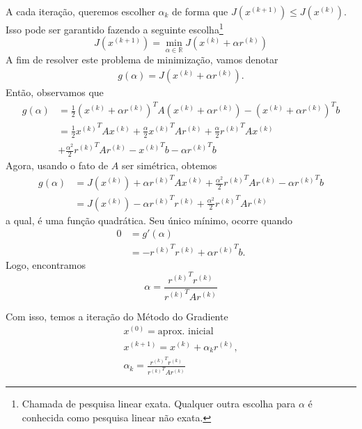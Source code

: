 A cada iteração, queremos escolher $\alpha_k$ de forma que $J\left(x^{(k+1)}\right) \leq J\left(x^{(k)}\right)$. Isso pode ser garantido fazendo a seguinte escolha\footnote{Chamada de pesquisa linear exata. Qualquer outra escolha para $\alpha$ é conhecida como pesquisa linear não exata.}
\begin{equation}
  J\left(x^{(k+1)}\right) = \min_{\alpha\in\mathbb{R}} J\left(x^{(k)} + \alpha r^{(k)}\right)
\end{equation}
A fim de resolver este problema de minimização, vamos denotar
\begin{gather}
  g(\alpha) = J\left(x^{(k)} + \alpha r^{(k)}\right).
\end{gather}
Então, observamos que
\begin{align}
  g(\alpha) &= \frac{1}{2}\left(x^{(k)} + \alpha r^{(k)}\right)^TA\left(x^{(k)} + \alpha r^{(k)}\right)
              - \left(x^{(k)} + \alpha r^{(k)}\right)^Tb \nonumber\\
            &= \frac{1}{2}{x^{(k)}}^TAx^{(k)} + \frac{\alpha}{2}{x^{(k)}}^TAr^{(k)}  + \frac{\alpha}{2} {r^{(k)}}^TAx^{(k)} \nonumber\\
            & + \frac{\alpha^2}{2}{r^{(k)}}^TAr^{(k)} - {x^{(k)}}^Tb - \alpha {r^{(k)}}^Tb
\end{align}
Agora, usando o fato de $A$ ser simétrica, obtemos
\begin{align}
  g(\alpha) &= J\left(x^{(k)}\right) + \alpha {r^{(k)}}^TAx^{(k)} + \frac{\alpha^2}{2}{r^{(k)}}^TAr^{(k)} - \alpha {r^{(k)}}^Tb\\
            &= J\left(x^{(k)}\right) - \alpha {r^{(k)}}^Tr^{(k)} + \frac{\alpha^2}{2}{r^{(k)}}^TAr^{(k)}
\end{align}
a qual, é uma função quadrática. Seu único mínimo, ocorre quando
\begin{align}
  0 &= g'(\alpha)\\
    &= - {r^{(k)}}^Tr^{(k)} + \alpha {r^{(k)}}^Tb.
\end{align}
Logo, encontramos
\begin{equation}
  \alpha = \frac{{r^{(k)}}^Tr^{(k)}}{{r^{(k)}}^TAr^{(k)}}
\end{equation}

Com isso, temos a iteração do Método do Gradiente
\begin{gather}
  x^{(0)} = \text{aprox. inicial}\\
  x^{(k+1)} = x^{(k)} + \alpha_kr^{(k)},\\
  \alpha_k = \frac{{r^{(k)}}^Tr^{(k)}}{{r^{(k)}}^TAr^{(k)}}
\end{gather}

